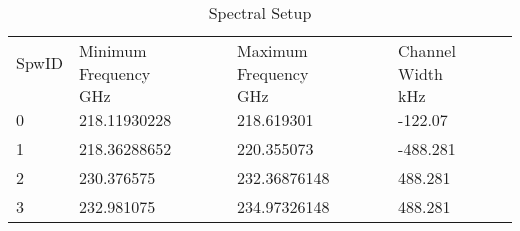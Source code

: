 \begin{table*}[htp]
\caption{Spectral Setup}
\begin{tabular}{llll}
\label{tab:spw}
SpwID & Minimum Frequency & Maximum Frequency & Channel Width \\
 & $\mathrm{GHz}$ & $\mathrm{GHz}$ & $\mathrm{kHz}$ \\
\hline
0 & 218.11930228 & 218.619301 & -122.07 \\
1 & 218.36288652 & 220.355073 & -488.281 \\
2 & 230.376575 & 232.36876148 & 488.281 \\
3 & 232.981075 & 234.97326148 & 488.281 \\
\hline
\end{tabular}
\end{table*}
